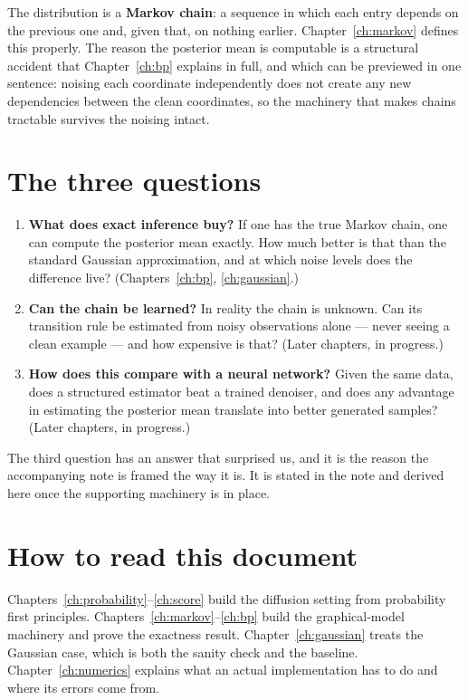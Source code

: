 The distribution is a \textbf{Markov chain}: a sequence in which each entry depends on the
previous one and, given that, on nothing earlier. Chapter~\ref{ch:markov} defines this
properly. The reason the posterior mean is computable is a structural accident that
Chapter~\ref{ch:bp} explains in full, and which can be previewed in one sentence: noising each
coordinate independently does not create any new dependencies between the clean coordinates,
so the machinery that makes chains tractable survives the noising intact.

\section{The three questions}

\begin{enumerate}
\item \textbf{What does exact inference buy?} If one has the true Markov chain, one can
compute the posterior mean exactly. How much better is that than the standard Gaussian
approximation, and at which noise levels does the difference live?
(Chapters~\ref{ch:bp}, \ref{ch:gaussian}.)

\item \textbf{Can the chain be learned?} In reality the chain is unknown. Can its transition
rule be estimated from noisy observations alone --- never seeing a clean example --- and how
expensive is that? (Later chapters, in progress.)

\item \textbf{How does this compare with a neural network?} Given the same data, does a
structured estimator beat a trained denoiser, and does any advantage in estimating the
posterior mean translate into better generated samples? (Later chapters, in progress.)
\end{enumerate}

The third question has an answer that surprised us, and it is the reason the accompanying note
is framed the way it is. It is stated in the note and derived here once the supporting
machinery is in place.

\section{How to read this document}

Chapters~\ref{ch:probability}--\ref{ch:score} build the diffusion setting from probability
first principles. Chapters~\ref{ch:markov}--\ref{ch:bp} build the graphical-model machinery
and prove the exactness result. Chapter~\ref{ch:gaussian} treats the Gaussian case, which is
both the sanity check and the baseline. Chapter~\ref{ch:numerics} explains what an actual
implementation has to do and where its errors come from.

